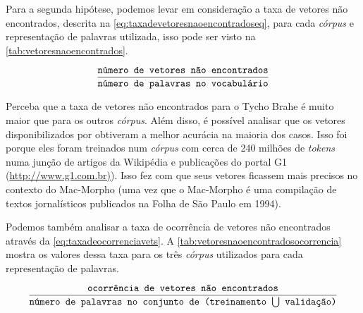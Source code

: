 Para a segunda hipótese, podemos levar em consideração a taxa de vetores não encontrados, descrita na \autoref{eq:taxadevetoresnaoencontradoseq}, para cada \textit{córpus} e representação de palavras utilizada, isso pode ser visto na \autoref{tab:vetoresnaoencontrados}. 

\begin{equation} \label{eq:taxadevetoresnaoencontradoseq}
\frac{\mbox{\texttt{número de vetores não encontrados}}}{\mbox{\texttt{número de palavras no vocabulário}}}
\end{equation}


Perceba que a taxa de vetores não encontrados para o Tycho Brahe é muito maior que para os outros \textit{córpus}. Além disso, é possível analisar que os vetores disponibilizados por  obtiveram a melhor acurácia na maioria dos casos. Isso foi porque eles foram treinados num \textit{córpus} com cerca de 240 milhões de \textit{tokens} numa junção de artigos da Wikipédia e publicações do portal G1 (\url{http://www.g1.com.br)}). Isso fez com que seus vetores ficassem mais precisos no contexto do Mac-Morpho (uma vez que o Mac-Morpho é uma compilação de textos jornalísticos publicados na Folha de São Paulo em 1994).

Podemos também analisar a taxa de ocorrência de vetores não encontrados através da \autoref{eq:taxadeocorrenciavets}. A \autoref{tab:vetoresnaoencontradosocorrencia} mostra os valores dessa taxa para os três \textit{córpus} utilizados para cada representação de palavras.

\begin{equation} \label{eq:taxadeocorrenciavets}
\frac{\mbox{\texttt{ocorrência de vetores não encontrados}}}{\mbox{\texttt{número de palavras no conjunto de (treinamento $\bigcup$ validação)}}}
\end{equation}








